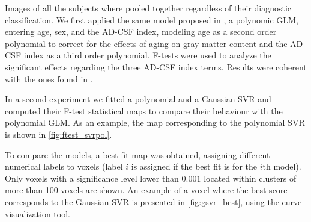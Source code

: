 \documentclass{article}
\begin{document}
Images of all the subjects where pooled together regardless of their diagnostic classification. We first applied the same model proposed in \cite{Nonlinear_Gispert_2015}, a polynomic GLM, entering age, sex, and the AD-CSF index, modeling age as a second order polynomial to correct for the effects of aging on gray matter content and the AD-CSF index as a third order polynomial. F-tests were used to analyze the significant effects regarding the three AD-CSF index terms. Results were coherent with the ones found in \cite{Nonlinear_Gispert_2015}.

In a second experiment we fitted a polynomial and a Gaussian SVR and computed their F-test statistical maps to compare their behaviour with the polynomial GLM. As an example, the map corresponding to the polynomial SVR is shown in \autoref{fig:ftest_svrpol}.

To compare the models, a best-fit map was obtained, assigning different numerical labels to voxels (label $i$ is assigned if the best fit is for the $i$th model).  Only voxels with a significance level lower than $0.001$ located within clusters of more than 100 voxels are shown. An example of a voxel where the best score corresponds to the Gaussian SVR is presented in \autoref{fig:gsvr_best}, using the curve visualization tool.
\end{document}
